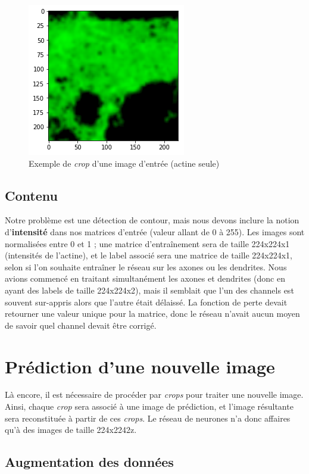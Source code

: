 \documentclass{report}
\begin{document}
\begin{figure}[H]
\centering
\includegraphics[scale=0.35]{"ex_crop"}
\caption{Exemple de \textit{crop} d'une image d'entrée (actine seule)}
\end{figure}

\subsection{Contenu}

Notre problème est une détection de contour, mais nous devons inclure la notion
d'\textbf{intensité} dans nos matrices d'entrée (valeur allant de 0 à 255).
Les images sont normalisées entre 0 et 1 ; une matrice d'entraînement sera de
taille 224x224x1 (intensités de l'actine), et le label associé sera une matrice
de taille 224x224x1, selon si l'on souhaite entraîner le réseau sur les axones
ou les dendrites. Nous avions commencé en traitant simultanément les axones et
dendrites (donc en ayant des labels de taille 224x224x2), mais il semblait
que l'un des channels est souvent sur-appris alors que l'autre était délaissé.
La fonction de perte devait retourner une valeur unique pour la matrice, donc
le réseau n'avait aucun moyen de savoir quel channel devait être corrigé.

\section{Prédiction d'une nouvelle image}

Là encore, il est nécessaire de procéder par \textit{crops} pour traiter une nouvelle
image. Ainsi, chaque \textit{crop} sera associé à une image de prédiction,
et l'image résultante sera reconstituée à partir de ces \textit{crops}. Le réseau
de neurones n'a donc affaires qu'à des images de taille 224x2242z.

\subsection{Augmentation des données}
\end{document}
